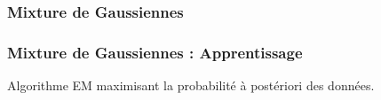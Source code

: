 \begin{frame}
  \frametitle{Mixture de Gaussiennes}
\end{frame}

\begin{frame}
  \frametitle{Mixture de Gaussiennes : Apprentissage}
  Algorithme EM maximisant la probabilité à postériori des données.
\end{frame}
